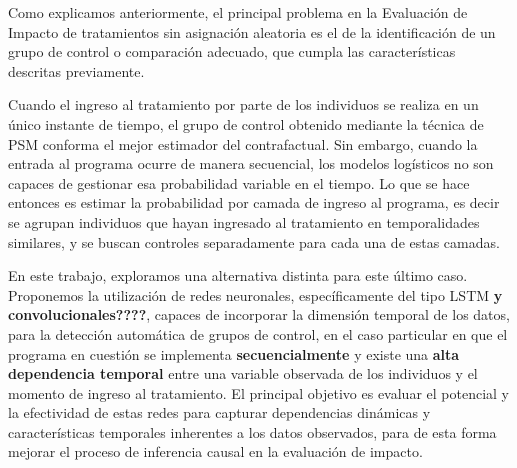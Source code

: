 \documentclass[../main.tex]{subfiles}
\begin{document}

Como explicamos anteriormente, el principal problema en la Evaluación de Impacto de
tratamientos sin asignación aleatoria es el de la identificación de un grupo de control o
comparación adecuado, que cumpla las características descritas previamente.

Cuando el ingreso al tratamiento por parte de los individuos se realiza en un único
instante de tiempo, el grupo de control obtenido mediante la técnica de PSM conforma el
mejor estimador del contrafactual. Sin embargo, cuando la entrada al programa ocurre de
manera secuencial, los modelos logísticos no son capaces de gestionar esa probabilidad
variable en el tiempo. Lo que se hace entonces es estimar la probabilidad por camada de
ingreso al programa, es decir se agrupan individuos que hayan ingresado al tratamiento en
temporalidades similares, y se buscan controles separadamente para cada una de estas
camadas.

En este trabajo, exploramos una alternativa distinta para este último caso. Proponemos la
utilización de redes neuronales, específicamente del tipo LSTM \textbf{y
convolucionales????}, capaces de incorporar la dimensión temporal de los datos, para la
detección automática de grupos de control, en el caso particular en que el programa en
cuestión se implementa \textbf{secuencialmente} y existe una \textbf{alta dependencia
temporal} entre una variable observada de los individuos y el momento de ingreso al
tratamiento. El principal objetivo es evaluar el potencial y la efectividad de estas redes
para capturar dependencias dinámicas y características temporales inherentes a los datos
observados, para de esta forma mejorar el proceso de inferencia causal en la evaluación de
impacto.

\end{document}
